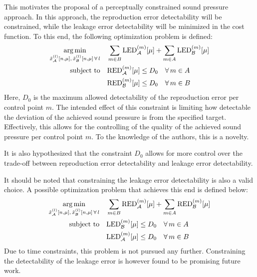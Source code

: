 This motivates the proposal of a perceptually constrained sound pressure approach.
In this approach, the reproduction error detectability will be constrained, while the leakage error detectability will be minimized in the cost function.
To this end, the following optimization problem is defined:
\begin{equation}
    \begin{aligned}
    \operatorname*{arg\,min}_{\tilde{x}_{\mathcal{A}}^{(l)}[n,\mu],\,\tilde{x}_{\mathcal{B}}^{(l)}[n,\mu]\,\forall\,l}\quad 
       & \sum_{m\in B}\text{LED}_{\mathcal{A}}^{(m)}[\mu] + \sum_{m\in A}\text{LED}_{\mathcal{B}}^{(m)}[\mu]\\
        \operatorname*{subject\,\,to}\quad & \text{RED}_{\mathcal{A}}^{(m)}[\mu] \leq D_0 \quad\forall\, m\in A\\
                    & \text{RED}_{\mathcal{B}}^{(m)}[\mu] \leq D_0 \quad\forall\, m\in B
    \end{aligned}
\end{equation}
Here, $D_0$ is the maximum allowed detectability of the reproduction error per control point $m$.
The intended effect of this constraint is limiting how detectable the deviation of the achieved sound pressure is from the specified target.
Effectively, this allows for the controlling of the quality of the achieved sound pressure per control point $m$. 
To the knowledge of the authors, this is a novelty.

It is also hypothesized that the constraint $D_0$ allows for more control over the trade-off between reproduction error detectability and 
leakage error detectability.

It should be noted that constraining the leakage error detectability is also a valid choice.
A possible optimization problem that achieves this end is defined below:
\begin{equation}
    \begin{aligned}
    \operatorname*{arg\,min}_{\tilde{x}_{\mathcal{A}}^{(l)}[n,\mu],\,\tilde{x}_{\mathcal{B}}^{(l)}[n,\mu]\,\forall\,l}\quad 
       & \sum_{m\in B}\text{RED}_{\mathcal{A}}^{(m)}[\mu] + \sum_{m\in A}\text{RED}_{\mathcal{B}}^{(m)}[\mu]\\
        \operatorname*{subject\,\,to}\quad & \text{LED}_{\mathcal{B}}^{(m)}[\mu] \leq D_0 \quad\forall\, m\in A\\
                    & \text{LED}_{\mathcal{A}}^{(m)}[\mu] \leq D_0 \quad\forall\, m\in B
    \end{aligned}
\end{equation}
Due to time constraints, this problem is not pursued any further.
Constraining the detectability of the leakage error is however found to be promising future work.
